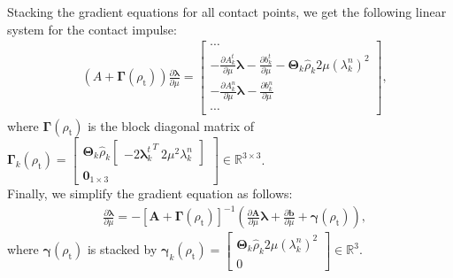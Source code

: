 Stacking the gradient equations for all contact points, we get the following linear system for the contact impulse:
\begin{align}
    \label{eq:smoothing_gradient}
    & (A + \mathbf{\Gamma}(\rho_\mathrm{t}) )\frac{\partial\bm{\lambda}}{\partial\mu} 
    =
    \begin{bmatrix} 
    \cdots \\
    - \frac{\partial A^t_{k}}{\partial \mu} \boldsymbol{\lambda} - \frac{\partial b^t_k}{\partial \mu}-\mathbf{\Theta}_{k} \hat{\rho}_{k} 2\mu(\lambda^{n}_{k})^2\\
    - \frac{\partial A^n_{k}}{\partial \mu} \boldsymbol{\lambda} - \frac{\partial b^n_k}{\partial \mu}\\
    \cdots 
    \end{bmatrix},
\end{align}
where $\mathbf{\Gamma}(\rho_\mathrm{t})$ is the block diagonal matrix of 
$ \mathbf{\Gamma}_{k}(\rho_\mathrm{t})=
\begin{bmatrix}
    \mathbf{\Theta}_{k} \hat{\rho}_{k} 
    \begin{bmatrix} -2{\boldsymbol{\lambda}^{t}_{k}}^T\ 2\mu^2\lambda^{n}_{k} \end{bmatrix} \\
    \mathbf{0}_{1\times3}
\end{bmatrix}\in\mathbb{R}^{3\times3}$.\\



Finally, we simplify the gradient equation as follows:
\begin{align}
    &\frac{\partial \bm{\lambda}}{\partial \mu}=-[\mathbf{A}+\mathbf{\Gamma}(\rho_\mathrm{t})]^{-1}(\frac{\partial \mathbf{A}}{\partial \mu} \bm{\lambda}+\frac{\partial \mathbf{b}}{\partial \mu} + \mathbf{\gamma}(\rho_\mathrm{t})), \label{eq:smoothing_gradient2}
\end{align}
where $\mathbf{\gamma}(\rho_\mathrm{t})$ is stacked by $\mathbf{\gamma}_{k}(\rho_\mathrm{t})=
\begin{bmatrix} 
\mathbf{\Theta}_{k}\hat{\rho}_{k}2\mu(\lambda^{n}_{k})^2\\
    0
\end{bmatrix}\in\mathbb{R}^{3}$.


